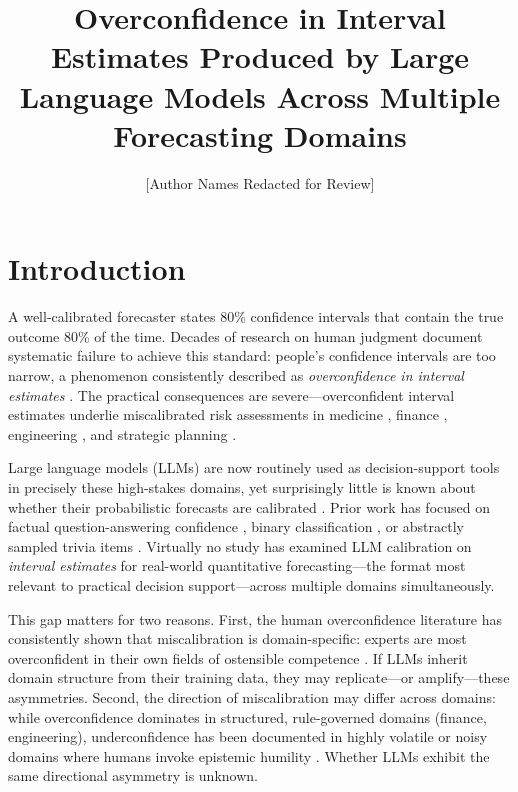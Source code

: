 \documentclass[9pt,twoside,lineno]{pnas-new}
\title{Overconfidence in Interval Estimates Produced by Large Language Models Across Multiple Forecasting Domains}
\author[a,1]{[Author Names Redacted for Review]}
\affil[a]{[Institution Redacted for Review]}
\begin{document}
\maketitle
\thispagestyle{firststyle}

\section*{Introduction}

A well-calibrated forecaster states 80\% confidence intervals that contain the true outcome 80\% of the time. Decades of research on human judgment document systematic failure to achieve this standard: people's confidence intervals are too narrow, a phenomenon consistently described as \textit{overconfidence in interval estimates} \citep{lichtenstein1982, alpert1982, klayman1999, soll2004}. The practical consequences are severe---overconfident interval estimates underlie miscalibrated risk assessments in medicine \citep{christensen2004}, finance \citep{ben-david2013}, engineering \citep{flyvbjerg2002}, and strategic planning \citep{lovallo2003}.

Large language models (LLMs) are now routinely used as decision-support tools in precisely these high-stakes domains, yet surprisingly little is known about whether their probabilistic forecasts are calibrated \citep{kadavath2022, xiong2024, openai2024}. Prior work has focused on factual question-answering confidence \citep{kadavath2022, lin2022}, binary classification \citep{xiong2024}, or abstractly sampled trivia items \citep{yang2023}. Virtually no study has examined LLM calibration on \textit{interval estimates} for real-world quantitative forecasting---the format most relevant to practical decision support---across multiple domains simultaneously.

This gap matters for two reasons. First, the human overconfidence literature has consistently shown that miscalibration is domain-specific: experts are most overconfident in their own fields of ostensible competence \citep{klayman1999, soll2004, christensen-szalanski1991}. If LLMs inherit domain structure from their training data, they may replicate---or amplify---these asymmetries. Second, the direction of miscalibration may differ across domains: while overconfidence dominates in structured, rule-governed domains (finance, engineering), underconfidence has been documented in highly volatile or noisy domains where humans invoke epistemic humility \citep{griffin1992}. Whether LLMs exhibit the same directional asymmetry is unknown.
\end{document}
